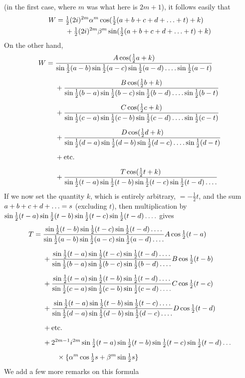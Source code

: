 (in the first case, where $m$ was what here is $2m+1$), it follows easily that
\[
\begin{aligned}
W={}&\tfrac12(2i)^{2m}\alpha^m\cos(\tfrac12(a+b+c+d+\mathinner{.\,.\,.}+t)+k)\\
&+\tfrac12(2i)^{2m}\beta^m\sin(\tfrac12(a+b+c+d+\mathinner{.\,.\,.}+t)+k)
\end{aligned}
\]
On the other hand,
\endgroup
\begingroup
\renewcommand{\arraystretch}{1.45}
\[
\begin{aligned}
W={}&\frac{A\cos(\tfrac12a+k)}{\sin\tfrac12(a-b)\sin\tfrac12(a-c)\sin\tfrac12(a-d)\mathinner{.\,.\,.\,.}\sin\tfrac12(a-t)}\\[5pt]
&+\frac{B\cos(\tfrac12b+k)}{\sin\tfrac12(b-a)\sin\tfrac12(b-c)\sin\tfrac12(b-d)\mathinner{.\,.\,.\,.}\sin\tfrac12(b-t)}\\[5pt]
&+\frac{C\cos(\tfrac12c+k)}{\sin\tfrac12(c-a)\sin\tfrac12(c-b)\sin\tfrac12(c-d)\mathinner{.\,.\,.\,.}\sin\tfrac12(c-t)}\\[5pt]
&+\frac{D\cos(\tfrac12d+k)}{\sin\tfrac12(d-a)\sin\tfrac12(d-b)\sin\tfrac12(d-c)\mathinner{.\,.\,.\,.}\sin\tfrac12(d-t)}\\[5pt]
&+\text{etc.}\\[5pt]
&+\frac{T\cos(\tfrac12t+k)}{\sin\tfrac12(t-a)\sin\tfrac12(t-b)\sin\tfrac12(t-c)\sin\tfrac12(t-d)\mathinner{.\,.\,.\,.}}
\end{aligned}
\]
If we now set the quantity $k$, which is entirely arbitrary, $=-\tfrac12t$,
and the sum $a+b+c+d+\mathinner{.\,.\,.}=s$ (excluding $t$), then multiplication by
$\sin\tfrac12(t-a)\sin\tfrac12(t-b)\sin\tfrac12(t-c)\sin\tfrac12(t-d)\mathinner{.\,.\,.\,.}$
gives
\[
\begin{aligned}
T={}&\frac{\sin\tfrac12(t-b)\sin\tfrac12(t-c)\sin\tfrac12(t-d)\mathinner{.\,.\,.\,.}}{\sin\tfrac12(a-b)\sin\tfrac12(a-c)\sin\tfrac12(a-d)\mathinner{.\,.\,.\,.}}A\cos\tfrac12(t-a)\\[5pt]
&+\frac{\sin\tfrac12(t-a)\sin\tfrac12(t-c)\sin\tfrac12(t-d)\mathinner{.\,.\,.\,.}}{\sin\tfrac12(b-a)\sin\tfrac12(b-c)\sin\tfrac12(b-d)\mathinner{.\,.\,.\,.}}B\cos\tfrac12(t-b)\\[5pt]
&+\frac{\sin\tfrac12(t-a)\sin\tfrac12(t-b)\sin\tfrac12(t-d)\mathinner{.\,.\,.\,.}}{\sin\tfrac12(c-a)\sin\tfrac12(c-b)\sin\tfrac12(c-d)\mathinner{.\,.\,.\,.}}C\cos\tfrac12(t-c)\\[5pt]
&+\frac{\sin\tfrac12(t-a)\sin\tfrac12(t-b)\sin\tfrac12(t-c)\mathinner{.\,.\,.\,.}}{\sin\tfrac12(d-a)\sin\tfrac12(d-b)\sin\tfrac12(d-c)\mathinner{.\,.\,.\,.}}D\cos\tfrac12(t-d)\\[5pt]
&+\text{etc.}\\[5pt]
&+2^{2m-1}i^{2m}\sin\tfrac12(t-a)\sin\tfrac12(t-b)\sin\tfrac12(t-c)\sin\tfrac12(t-d)\mathinner{.\,.\,.}\\[5pt]
&\qquad\times\{\alpha^m\cos\tfrac12s+\beta^m\sin\tfrac12s\}
\end{aligned}
\]
We add a few more remarks on this formula

